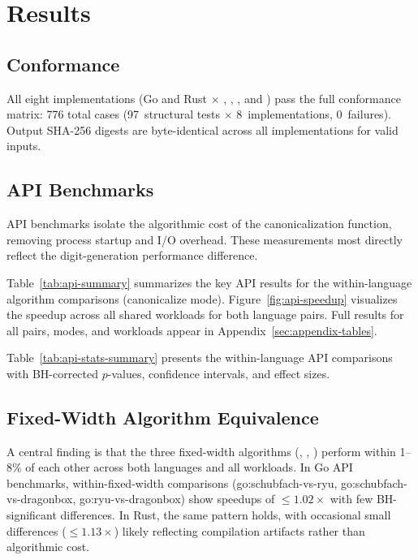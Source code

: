 \section{Results}
\label{sec:results}


\subsection{Conformance}

All eight implementations (Go and Rust $\times$ \schubfach, \ryualg,
\dragonbox, and \burgerdybvig) pass the full conformance matrix: 776 total
cases (97~structural tests $\times$ 8~implementations, 0~failures).
Output SHA-256 digests are byte-identical across all implementations for
valid inputs.

\subsection{API Benchmarks}

API benchmarks isolate the algorithmic cost of the canonicalization
function, removing process startup and I/O overhead.  These measurements
most directly reflect the digit-generation performance difference.

Table~\ref{tab:api-summary} summarizes the key API results for the
within-language algorithm comparisons (canonicalize mode).
Figure~\ref{fig:api-speedup} visualizes the speedup across all shared
workloads for both language pairs.  Full results
for all pairs, modes, and workloads appear in
Appendix~\ref{sec:appendix-tables}.



Table~\ref{tab:api-stats-summary} presents the within-language API
comparisons with BH-corrected $p$-values, confidence intervals, and
effect sizes.





\subsection{Fixed-Width Algorithm Equivalence}

A central finding is that the three fixed-width algorithms (\schubfach,
\ryualg, \dragonbox) perform within 1--8\% of each other across both
languages and all workloads.  In Go API benchmarks, within-fixed-width
comparisons (go:schubfach-vs-ryu, go:schubfach-vs-dragonbox,
go:ryu-vs-dragonbox) show speedups of ${\leq}1.02\times$ with few
BH-significant differences.  In Rust, the same pattern holds, with
occasional small differences (${\leq}1.13\times$) likely reflecting
compilation artifacts rather than algorithmic cost.

